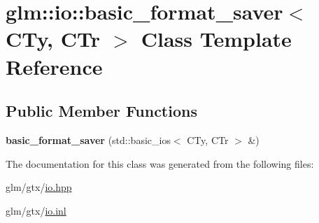 \hypertarget{classglm_1_1io_1_1basic__format__saver}{\section{glm\-:\-:io\-:\-:basic\-\_\-format\-\_\-saver$<$ C\-Ty, C\-Tr $>$ Class Template Reference}
\label{classglm_1_1io_1_1basic__format__saver}
}
\subsection*{Public Member Functions}
\begin{DoxyCompactItemize}
\item 
\hypertarget{classglm_1_1io_1_1basic__format__saver_a9688fa6dce0c32285527df2336ca9127}{{\bfseries basic\-\_\-format\-\_\-saver} (std\-::basic\-\_\-ios$<$ C\-Ty, C\-Tr $>$ \&)}\label{classglm_1_1io_1_1basic__format__saver_a9688fa6dce0c32285527df2336ca9127}

\end{DoxyCompactItemize}


The documentation for this class was generated from the following files\-:\begin{DoxyCompactItemize}
\item 
glm/gtx/\hyperlink{io_8hpp}{io.\-hpp}\item 
glm/gtx/\hyperlink{io_8inl}{io.\-inl}\end{DoxyCompactItemize}
